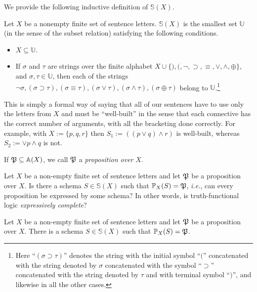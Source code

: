 We provide the following inductive definition of $\mathbb{S}(X)$. 
\begin{definition}
Let $X$ be a nonempty finite set of sentence letters. $\mathbb{S}(X)$ is the smallest set $\mathbb{U}$ (in the sense of the subset relation) satisfying the following conditions.
\begin{itemize}
\item $X\subseteq \mathbb{U}$.
\item If $\sigma$ and $\tau$ are strings over the finite alphabet $X\cup\{),(,\neg,\supset,\equiv,\vee,\wedge,\oplus\}$, and $\sigma,\tau\in\mathbb{U}$, then each of the strings $\neg\sigma, (\sigma\supset\tau),(\sigma\equiv\tau),(\sigma\vee\tau),(\sigma\wedge\tau),(\sigma\oplus\tau)$ belong to $\mathbb{U}$.\footnote{Here ``$(\sigma\supset\tau)$'' denotes the string with the initial symbol ``$($'' concatenated with the string denoted by $\sigma$ concatenated with the symbol ``$\supset$'' concatenated with the string denoted by $\tau$ and with terminal symbol ``$)$'', and likewise in all the other cases.}
\end{itemize}
\end{definition}

\begin{aside}
    This is simply a formal way of saying that all of our sentences have to use only the letters from $X$ and must be ``well-built'' in the sense that each connective has the correct number of arguments, with all the bracketing done correctly. For example, with $X := \{p, q, r\}$ then $S_1 := ((p \vee q) \land r)$ is well-built, whereas $S_2 := \vee p \land q$ is not. 
\end{aside}



If $\mfp\subseteq\mathbb{A}(X)$, we call $\mfp$ a \emph{proposition over} $X$. 

Let $X$ be a non-empty finite set of sentence letters and let $\mfp$ be a proposition over $X$. Is there a schema $S\in\mathbb{S}(X)$ such that $\prop{S}{X}=\mfp$, \emph{i.e.}, can every proposition be expressed by some schema? In other words, is truth-functional logic \emph{expressively complete}? 

\begin{theorem}\label{tflexpcomp-thm}
Let $X$ be a non-empty finite set of sentence letters and let $\mfp$ be a proposition over $X$. There is a schema $S\in\mathbb{S}(X)$ such that $\prop{S}{X}=\mfp$.
\end{theorem}

